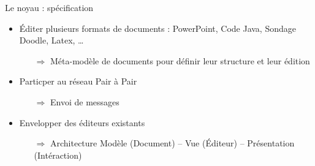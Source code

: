 \begin{frame}{Le noyau : spécification}
\begin{itemize}
  \item Éditer plusieurs formats de documents : PowerPoint, Code Java, Sondage
  Doodle, Latex, \ldots 
    \begin{itemize}
    \item[$\Rightarrow$] Méta-modèle de documents pour définir leur structure
    et leur édition
    \end{itemize}
  \item Particper au réseau Pair à Pair
    \begin{itemize}
    \item[$\Rightarrow$] Envoi de messages
    \end{itemize}
  \item Envelopper des éditeurs existants
    \begin{itemize}
    \item[$\Rightarrow$] Architecture Modèle (Document) -- Vue (Éditeur) --
    Présentation (Intéraction)
    \end{itemize}
\end{itemize}
\end{frame}

